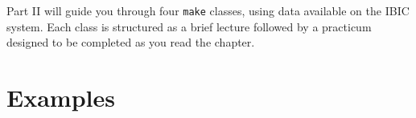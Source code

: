 \documentclass[oneside,11pt]{memoir}
\newcommand\maken{\texttt{make}} %
\begin{document}
	\begin{vplace}[0.7]
		
		\thispagestyle{empty}
		\large
		\noindent Part II will guide you through four \maken{} classes, using data available on the IBIC system. Each class is structured as a brief lecture followed by a 	practicum designed to be completed as you read the chapter.
		
	\end{vplace}
	
	
	\part{Examples}
	
	
	
	\appendix
	
	
	
	
	
	
\end{document}
